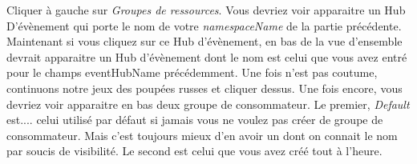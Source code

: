 Cliquer à gauche sur \textit{Groupes de ressources}. Vous devriez voir apparaitre un Hub D'évènement qui porte le nom de votre \textit{namespaceName} de la partie précédente. Maintenant si vous cliquez sur ce Hub d'évènement, en bas de la vue d'ensemble devrait apparaitre un Hub d'évènement dont le nom est celui que vous avez entré pour le champs eventHubName précédemment. Une fois n'est pas coutume, continuons notre jeux des poupées russes et cliquer dessus. Une fois encore, vous devriez voir apparaitre en bas deux groupe de consommateur. Le premier, \textit{Default} est.... celui utilisé par défaut si jamais vous ne voulez pas créer de groupe de consommateur. Mais c'est toujours mieux d'en avoir un dont on connait le nom par soucis de visibilité. Le second est celui que vous avez créé tout à l'heure.\\


